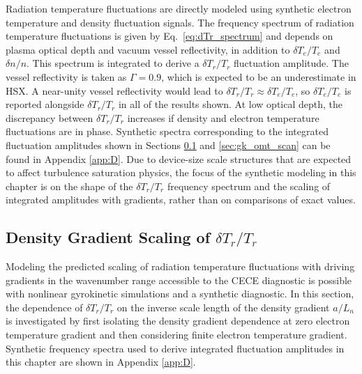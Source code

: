 \documentclass[%
 aip,
 amsmath,amssymb,
 reprint,%
]{revtex4-1}
\begin{document}
Radiation temperature fluctuations are directly modeled using synthetic electron temperature and density fluctuation signals. The frequency spectrum of radiation temperature fluctuations is given by Eq.\ \eqref{eq:dTr_spectrum} and depends on plasma optical depth and vacuum vessel reflectivity, in addition to $\delta T_e/T_e$ and $\delta n/n$. This spectrum is integrated to derive a $\delta T_r/T_r$ fluctuation amplitude. The vessel reflectivity is taken as $\Gamma=0.9$, which is expected to be an underestimate in HSX. A near-unity vessel reflectivity would lead to $\delta T_r/T_r \approx \delta T_e/T_e$, so $\delta T_e/T_e$ is reported alongside $\delta T_r/T_r$ in all of the results shown. At low optical depth, the discrepancy between $\delta T_r/T_r$ increases if density and electron temperature fluctuations are in phase. Synthetic spectra corresponding to the integrated fluctuation amplitudes shown in Sections \ref{sec:gk_omn_scan} and \ref{sec:gk_omt_scan} can be found in Appendix \ref{app:D}. Due to device-size scale structures that are expected to affect turbulence saturation physics, the focus of the synthetic modeling in this chapter is on the shape of the $\delta T_r/T_r$ frequency spectrum and the scaling of integrated amplitudes with gradients, rather than on comparisons of exact values.



\subsection{Density Gradient Scaling of $\delta T_r/T_r$ } \label{sec:gk_omn_scan}

Modeling the predicted scaling of radiation temperature fluctuations with driving gradients in the wavenumber range accessible to the CECE diagnostic is possible with nonlinear gyrokinetic simulations and a synthetic diagnostic. In this section, the dependence of $\delta T_r/T_r$  on the inverse scale length of the density gradient $a/L_n$ is investigated by first isolating the density gradient dependence at zero electron temperature gradient and then considering finite electron temperature gradient. Synthetic frequency spectra used to derive integrated fluctuation amplitudes in this chapter are shown in Appendix \ref{app:D}.
\end{document}
